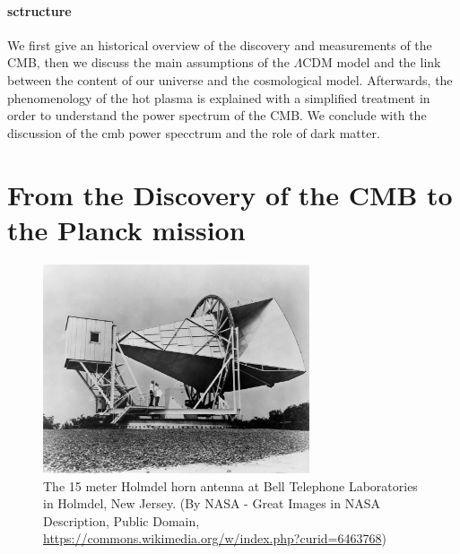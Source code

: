 \documentclass{article}
\begin{document}
\paragraph{sctructure}
We first give an historical overview of the discovery and measurements of the CMB, then we discuss the main assumptions of the $\Lambda$CDM model and the link between the content of our universe and the cosmological model. Afterwards, the phenomenology of the hot plasma is explained with a simplified treatment in order to understand the power spectrum of the CMB.
We conclude with the discussion of the cmb power specctrum and the role of dark matter.



\section{From the Discovery of the CMB to the Planck mission}

\begin{figure}
\begin{center}
\includegraphics[width=0.7\textwidth]{Horn_Antenna.jpeg}
\caption{The 15 meter Holmdel horn antenna at Bell Telephone Laboratories in Holmdel, New Jersey.
(By NASA - Great Images in NASA Description, Public Domain, \url{https://commons.wikimedia.org/w/index.php?curid=6463768})}
\end{center}

\end{figure}
\end{document}

